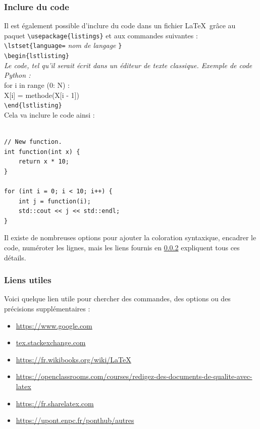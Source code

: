 \documentclass[11pt]{article}				%
\begin{document}
\subsubsection{Inclure du code}


\noindent Il est également possible d'inclure du code dans un fichier \LaTeX \ grâce au paquet \verb?\usepackage{listings}? et aux commandes suivantes : \\

\noindent \verb?\lstset{language=? \emph{nom de langage} \verb?}? \\
\verb?\begin{lstlisting}? \\
\emph{Le code, tel qu'il serait écrit dans un éditeur de texte classique. Exemple de code Python :} \\
for i in range (0: N) : \\
\indent X[i] = methode(X[i - 1]) \\
\verb?\end{lstlisting}? \\

\noindent Cela va inclure le code ainsi :

\lstset{language=c++}
\begin{lstlisting}

// New function.
int function(int x) {
    return x * 10;
}

for (int i = 0; i < 10; i++) {
	int j = function(i);
	std::cout << j << std::endl;
}

\end{lstlisting}

\noindent Il existe de nombreuses options pour ajouter la coloration syntaxique, encadrer le code, numéroter les lignes, mais les liens fournis en \ref{lien} expliquent tous ces détails.


\subsubsection{Liens utiles}\label{lien}


\noindent Voici quelque lien utile pour chercher des commandes, des options ou des précisions supplémentaires :
\begin{itemize}
	\item \url{https://www.google.com}
	\item \url{tex.stackexchange.com}
	\item \url{https://fr.wikibooks.org/wiki/LaTeX}
	\item \url{https://openclassrooms.com/courses/redigez-des-documents-de-qualite-avec-latex}
	\item \url{https://fr.sharelatex.com}
	\item \url{https://upont.enpc.fr/ponthub/autres}
\end{itemize}
\end{document}
